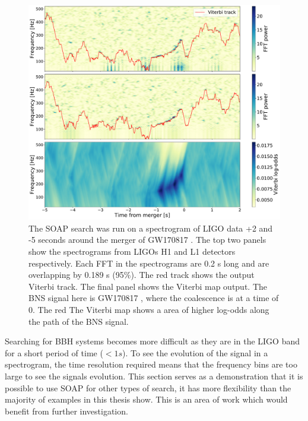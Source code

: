 \begin{figure}[h]
	\centering
	\includegraphics[width=\linewidth]{C3_soap/gw170817_vitplot.pdf}
        \caption[SOAP search run on GW170817]{The SOAP search was run on a
spectrogram of \gls{LIGO} data +2 and -5 seconds around the merger of GW170817
\citep{abbott2017GW170817Observation}. The top two panels show the spectrograms from \glspl{LIGO} H1 and L1 detectors respectively. Each \gls{FFT} in the spectrograms are
0.2 s long and are overlapping by  0.189 s (95\%). The red track shows the output Viterbi track. The final panel shows the Viterbi map output. The \gls{BNS} signal here is GW170817 \citep{abbott2017GW170817Observation}, where the coalescence is at a time of 0. The red The Viterbi map shows a area of higher
log-odds along the path of the \gls{BNS} signal.~}
\label{soap:sens:other:gw170817}

\end{figure}

Searching for \gls{BBH} systems becomes more difficult as they are in the \gls{LIGO} band for a short period of time ($ < 1 s$).
To see the evolution of the signal in a spectrogram, the time resolution required means that the frequency bins are too large to see the signals evolution.
This section serves as a demonstration that it is possible to use SOAP for other types of search, it has more flexibility than the majority of examples in this thesis show.
This is an area of work which would benefit from further
investigation.~

